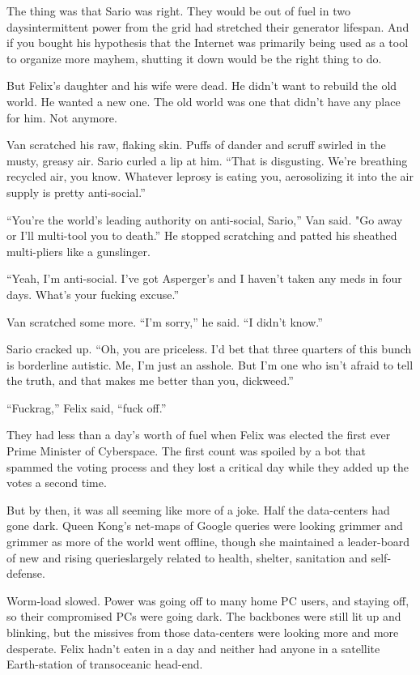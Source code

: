 The thing was that Sario was right. They would be out of fuel in
two days\dash{}intermittent power from the grid had stretched their
generator lifespan. And if you bought his hypothesis that the
Internet was primarily being used as a tool to organize more
mayhem, shutting it down would be the right thing to do.

But Felix’s daughter and his wife were dead. He didn’t want to
rebuild the old world. He wanted a new one. The old world was one
that didn’t have any place for him. Not anymore.

Van scratched his raw, flaking skin. Puffs of dander and scruff
swirled in the musty, greasy air. Sario curled a lip at him. “That
is disgusting. We’re breathing recycled air, you know. Whatever
leprosy is eating you, aerosolizing it into the air supply is
pretty anti-social.”

“You’re the world’s leading authority on anti-social, Sario,” Van
said. "Go away or I’ll multi-tool you to death.” He stopped
scratching and patted his sheathed multi-pliers like a gunslinger.

“Yeah, I’m anti-social. I’ve got Asperger’s and I haven’t taken any
meds in four days. What’s your fucking excuse.”

Van scratched some more. “I’m sorry,” he said. “I didn’t know.”

Sario cracked up. “Oh, you are priceless. I’d bet that three
quarters of this bunch is borderline autistic. Me, I’m just an
asshole. But I’m one who isn’t afraid to tell the truth, and that
makes me better than you, dickweed.”

“Fuckrag,” Felix said, “fuck off.”

\tb

They had less than a day’s worth of fuel when Felix was elected the
first ever Prime Minister of Cyberspace. The first count was
spoiled by a bot that spammed the voting process and they lost a
critical day while they added up the votes a second time.

But by then, it was all seeming like more of a joke. Half the
data-centers had gone dark. Queen Kong’s net-maps of Google queries
were looking grimmer and grimmer as more of the world went offline,
though she maintained a leader-board of new and rising
queries\dash{}largely related to health, shelter, sanitation and
self-defense.

Worm-load slowed. Power was going off to many home PC users, and
staying off, so their compromised PCs were going dark. The
backbones were still lit up and blinking, but the missives from
those data-centers were looking more and more desperate. Felix
hadn’t eaten in a day and neither had anyone in a satellite
Earth-station of transoceanic head-end.

